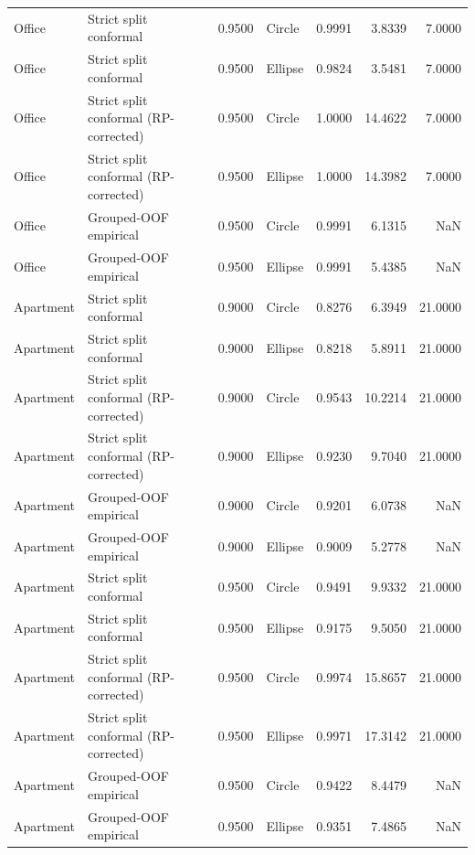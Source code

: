 \begin{table}
\begin{tabular}{llrlrrr}
Office & Strict split conformal & 0.9500 & Circle & 0.9991 & 3.8339 & 7.0000 \\
Office & Strict split conformal & 0.9500 & Ellipse & 0.9824 & 3.5481 & 7.0000 \\
Office & Strict split conformal (RP-corrected) & 0.9500 & Circle & 1.0000 & 14.4622 & 7.0000 \\
Office & Strict split conformal (RP-corrected) & 0.9500 & Ellipse & 1.0000 & 14.3982 & 7.0000 \\
Office & Grouped-OOF empirical & 0.9500 & Circle & 0.9991 & 6.1315 & NaN \\
Office & Grouped-OOF empirical & 0.9500 & Ellipse & 0.9991 & 5.4385 & NaN \\
Apartment & Strict split conformal & 0.9000 & Circle & 0.8276 & 6.3949 & 21.0000 \\
Apartment & Strict split conformal & 0.9000 & Ellipse & 0.8218 & 5.8911 & 21.0000 \\
Apartment & Strict split conformal (RP-corrected) & 0.9000 & Circle & 0.9543 & 10.2214 & 21.0000 \\
Apartment & Strict split conformal (RP-corrected) & 0.9000 & Ellipse & 0.9230 & 9.7040 & 21.0000 \\
Apartment & Grouped-OOF empirical & 0.9000 & Circle & 0.9201 & 6.0738 & NaN \\
Apartment & Grouped-OOF empirical & 0.9000 & Ellipse & 0.9009 & 5.2778 & NaN \\
Apartment & Strict split conformal & 0.9500 & Circle & 0.9491 & 9.9332 & 21.0000 \\
Apartment & Strict split conformal & 0.9500 & Ellipse & 0.9175 & 9.5050 & 21.0000 \\
Apartment & Strict split conformal (RP-corrected) & 0.9500 & Circle & 0.9974 & 15.8657 & 21.0000 \\
Apartment & Strict split conformal (RP-corrected) & 0.9500 & Ellipse & 0.9971 & 17.3142 & 21.0000 \\
Apartment & Grouped-OOF empirical & 0.9500 & Circle & 0.9422 & 8.4479 & NaN \\
Apartment & Grouped-OOF empirical & 0.9500 & Ellipse & 0.9351 & 7.4865 & NaN \\
\bottomrule
\end{tabular}
\end{table}
